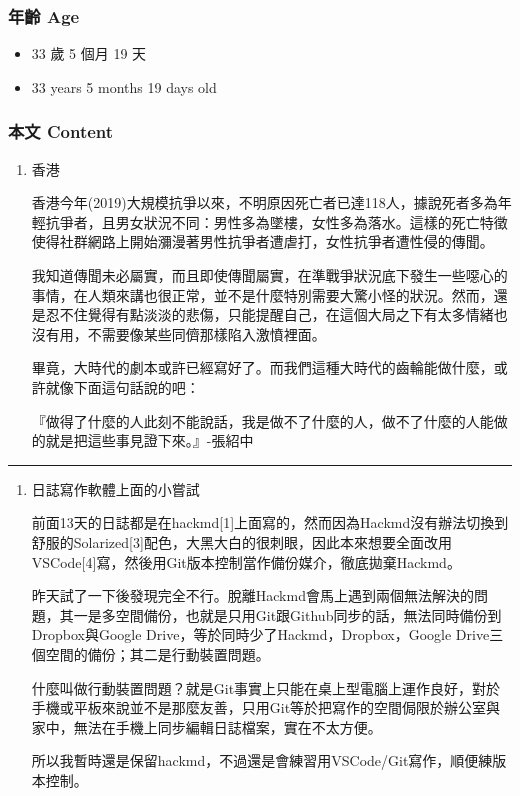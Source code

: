 \documentclass[
]{article}
\providecommand{\tightlist}{%
  \setlength{\itemsep}{0pt}\setlength{\parskip}{0pt}}
\begin{document}
\hypertarget{ux5e74ux9f61-age-13}{%
\subsubsection{年齡 Age}\label{ux5e74ux9f61-age-13}}

\begin{itemize}
\tightlist
\item
  33 歲 5 個月 19 天
\item
  33 years 5 months 19 days old
\end{itemize}

\hypertarget{ux672cux6587-content-13}{%
\subsubsection{本文 Content}\label{ux672cux6587-content-13}}

\begin{enumerate}
\def\labelenumi{\arabic{enumi}.}
\item
  香港

  香港今年(2019)大規模抗爭以來，不明原因死亡者已達118人，據說死者多為年輕抗爭者，且男女狀況不同：男性多為墜樓，女性多為落水。這樣的死亡特徵使得社群網路上開始瀰漫著男性抗爭者遭虐打，女性抗爭者遭性侵的傳聞。

  我知道傳聞未必屬實，而且即使傳聞屬實，在準戰爭狀況底下發生一些噁心的事情，在人類來講也很正常，並不是什麼特別需要大驚小怪的狀況。然而，還是忍不住覺得有點淡淡的悲傷，只能提醒自己，在這個大局之下有太多情緒也沒有用，不需要像某些同儕那樣陷入激憤裡面。

  畢竟，大時代的劇本或許已經寫好了。而我們這種大時代的齒輪能做什麼，或許就像下面這句話說的吧：

  『做得了什麼的人此刻不能說話，我是做不了什麼的人，做不了什麼的人能做的就是把這些事見證下來。』-張紹中
\end{enumerate}

\begin{center}\rule{0.5\linewidth}{\linethickness}\end{center}

\begin{enumerate}
\def\labelenumi{\arabic{enumi}.}
\setcounter{enumi}{1}
\item
  日誌寫作軟體上面的小嘗試

  前面13天的日誌都是在hackmd{[}1{]}上面寫的，然而因為Hackmd沒有辦法切換到舒服的Solarized{[}3{]}配色，大黑大白的很刺眼，因此本來想要全面改用VSCode{[}4{]}寫，然後用Git版本控制當作備份媒介，徹底拋棄Hackmd。

  昨天試了一下後發現完全不行。脫離Hackmd會馬上遇到兩個無法解決的問題，其一是多空間備份，也就是只用Git跟Github同步的話，無法同時備份到Dropbox與Google
  Drive，等於同時少了Hackmd，Dropbox，Google
  Drive三個空間的備份；其二是行動裝置問題。

  什麼叫做行動裝置問題？就是Git事實上只能在桌上型電腦上運作良好，對於手機或平板來說並不是那麼友善，只用Git等於把寫作的空間侷限於辦公室與家中，無法在手機上同步編輯日誌檔案，實在不太方便。

  所以我暫時還是保留hackmd，不過還是會練習用VSCode/Git寫作，順便練版本控制。
\end{enumerate}
\end{document}
